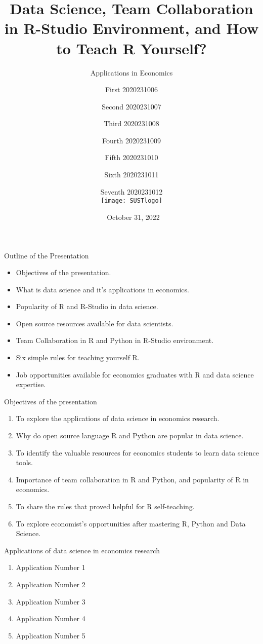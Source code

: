 \documentclass{beamer}
\title[ECO247 Presentation]{ Data Science, Team Collaboration in R-Studio Environment, and  How to Teach R Yourself?}
\subtitle{Applications in Economics}
\author[Group Four]{\tiny First \tiny 2020231006 \and
Second \tiny 2020231007 \and
Third \tiny 2020231008 \and
Fourth \tiny 2020231009 \and
Fifth \tiny 2020231010 \and
Sixth \tiny 2020231011 \and
Seventh \tiny 2020231012 \\ [5mm]
\texttt{[image: SUSTlogo]}}
\institute[Economics, SUST]{\large Department of Economics, \\Shahjalal University of Science and Technology, Bangladesh}
\date[\tiny]{\ October 31, 2022}
\begin{document}
	\begin{frame}
		\maketitle
	\end{frame}

	
	\begin{frame}[t] {Outline of the Presentation}
			\begin{itemize}
			\item Objectives of the presentation.
			\item What is data science and it's applications in economics.
			\item Popularity of R and R-Studio in data science.
			\item Open source resources available for data scientists.
			\item Team Collaboration in R and Python in R-Studio environment.
			\item Six simple rules for teaching yourself R.
			\item Job opportunities available for economics graduates with R and data science expertise. 
		\end{itemize}
		
	\end{frame}

	
	\begin{frame}[t]{Objectives of the presentation}
		
			\begin{enumerate}
			\item To explore the applications of data science in economics research.
			\item  Why do open source language R and Python are popular in data science.
			\item  To identify the valuable resources for economics students to learn data science tools. 
			\item Importance of team collaboration in R and Python, and popularity of R in economics.
			\item To share the rules that proved helpful for R self-teaching.
			\item To explore economist's opportunities after mastering R, Python and Data Science.
		\end{enumerate}
	
		
	\end{frame}
\begin{frame}[t]{Applications of data science in economics research}
	
	
		\begin{enumerate}
		\item Application Number 1
		\item  Application Number 2
		\item  Application Number 3
		\item Application Number 4
		\item Application Number 5
	\end{enumerate}

\end{frame}
\end{document}
